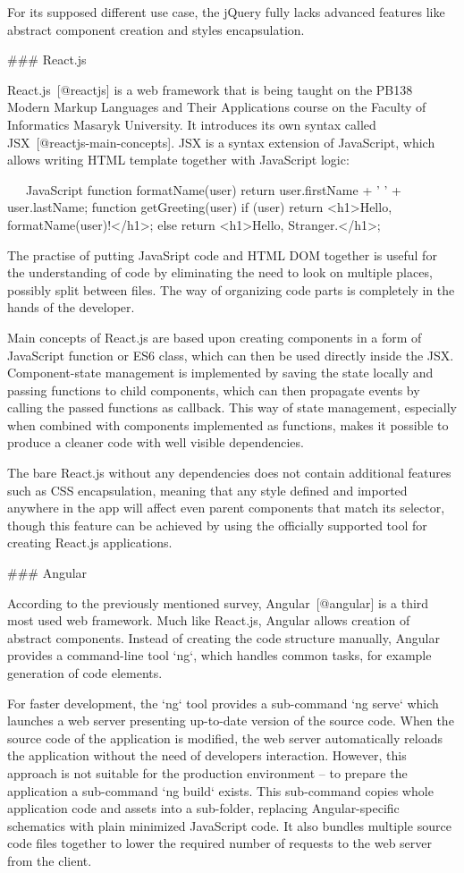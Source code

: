 \documentclass[
  digital, %
  oneside, %
  lof,     %
  lot,     %
]{fithesis4}
\begin{document}
For its supposed different use case, the jQuery fully lacks advanced features like abstract component creation and styles encapsulation.

### React.js

React.js~[@reactjs] is a web framework that is being taught on the PB138 Modern Markup Languages and Their Applications course on the Faculty of Informatics Masaryk University. It introduces its own syntax called JSX~[@reactjs-main-concepts]. JSX is a syntax extension of JavaScript, which allows writing HTML template together with JavaScript logic:

~~~JavaScript
function formatName(user) {
  return user.firstName + ' ' + user.lastName;
}
function getGreeting(user) {
  if (user) return <h1>Hello, {formatName(user)}!</h1>;
  else return <h1>Hello, Stranger.</h1>;
}
~~~

The practise of putting JavaSript code and HTML DOM together is useful for the understanding of code by eliminating the need to look on multiple places, possibly split between files. The way of organizing code parts is completely in the hands of the developer.

Main concepts of React.js are based upon creating components in a form of JavaScript function or ES6 class, which can then be used directly inside the JSX. Component-state management is implemented by saving the state locally and passing functions to child components, which can then propagate events by calling the passed functions as callback. This way of state management, especially when combined with components implemented as functions, makes it possible to produce a cleaner code with well visible dependencies.

The bare React.js without any dependencies does not contain additional features such as CSS encapsulation, meaning that any style defined and imported anywhere in the app will affect even parent components that match its selector, though this feature can be achieved by using the officially supported tool for creating React.js applications.

### Angular

According to the previously mentioned survey, Angular~[@angular] is a third most used web framework. Much like React.js, Angular allows creation of abstract components. Instead of creating the code structure manually, Angular provides a command-line tool `ng`, which handles common tasks, for example generation of code elements.

For faster development, the `ng` tool provides a sub-command `ng serve` which launches a web server presenting up-to-date version of the source code. When the source code of the application is modified, the web server automatically reloads the application without the need of developers interaction. However, this approach is not suitable for the production environment -- to prepare the application a sub-command `ng build` exists. This sub-command copies whole application code and assets into a sub-folder, replacing Angular-specific schematics with plain minimized JavaScript code. It also bundles multiple source code files together to lower the required number of requests to the web server from the client.
\end{document}
